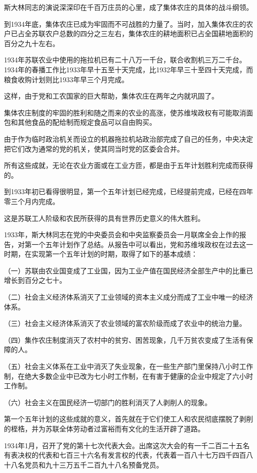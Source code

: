 斯大林同志的演说深深印在千百万庄员的心里，成了集体农庄的具体的战斗纲领。

到1934年底，集体农庄已成为牢固而不可战胜的力量了。当时，加入集体农庄的农户已占全苏联农户总数的四分之三左右，集体农庄的耕地面积已占全国耕地面积的百分之九十左右。

1934年苏联农业中使用的拖拉机已有二十八万一千台，联合收割机三万二千台。1934年的春播工作比1933年早十五至十天完成，比1932年早三十至四十天完成，而粮食收购计划则比1933年早三个月完成。

这样，由于党和工农国家的巨大帮助，集体农庄在两年之内就巩固了。

集体农庄制度的牢固的胜利和随之而来的农业的高涨，使苏维埃政权有可能取消面包和其他食品的配给制而规定食品可以自由购买。

由于作为临时政治机关而设立的机器拖拉机站政治部完成了自己的任务，中央决定把它们改为通常的党的机关，使其同当时党的区委会合并。

所有这些成就，无论在农业方面或在工业方匝，都是由于五年计划胜利完成而获得的。

到1933年初已看得很明显，第一个五年计划已经完成，已经提前完成，已经在四年零三个月内完成。

这是苏联工人阶级和农民所获得的具有世界历史意义的伟大胜利。

1933年，斯大林同志在党的中央委员会和中央监察委员会一月联席全会上作的报告，对第一个五年计划作了总结。从报告中可以看出，党和苏维埃政权在过去这一时期，在实现第一个五年计划的时期，取得了如下的基本成绩：

（一）苏联由农业国变成了工业国，因为工业产值在国民经济全部生产中的比重已增长到百分之七十。

（二）社会主义经济体系消灭了工业领域的资本主义成分而成了工业中唯一的经济体系。

（三）社会主义经济体系消灭了农业领域的富农阶级而成了农业中的统治力量。

（四）集作农庄制度消灭了农村中的贫穷、困苦现象，几千万贫农变成了生活有保障的人。

（五）社会主义体系在工业中消灭了失业现象，在一些生产部门里保持八小时工作制，在绝大多数企业中已改为七小时工作制，在有害于健康的企业中规定了六小时工作制。

（六）社会主义在国民经济一切部门的胜利消灭了人剥削人的现象。

第一个五年计划的这些成就的意义，首先就在于它们使工人和农民彻底摆脱了剥削的桎梏，并为苏联全体劳动者过富裕而有文化的生活开辟了道路。

1934年1月，召开了党的第十七次代表大会。出席这次大会的有一千二百二十五名有表决权的代表和七百三十六名有发言权的代表，代表着一百八十七万四千四百八十八名党员和九十三万五千二百九十八名预备党员。

